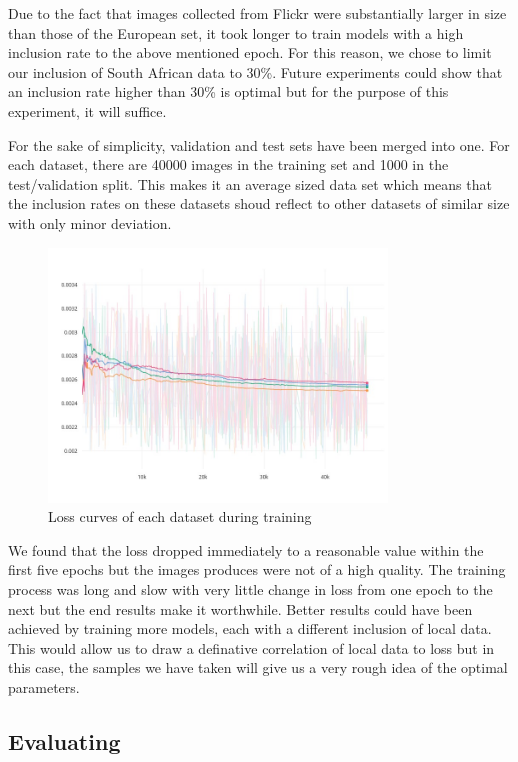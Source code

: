 \documentclass[conference]{IEEEtran}
\begin{document}
Due to the fact that images collected from Flickr were substantially larger in size than those of the European set, it took longer to train models with a high inclusion rate to the above mentioned epoch. For this reason, we chose to limit our inclusion of South African data to 30\%. Future experiments could show that an inclusion rate higher than 30\% is optimal but for the purpose of this experiment, it will suffice.

For the sake of simplicity, validation and test sets have been merged into one. For each dataset, there are 40000 images in the training set and 1000 in the test/validation split. This makes it an average sized data set which means that the inclusion rates on these datasets shoud reflect to other datasets of similar size with only minor deviation.

\begin{figure}[h]
\centering
\includegraphics[width=9cm]{Curves/loss_train}
\caption{Loss curves of each dataset during training}
\label{fig:loss_train}
\end{figure}

We found that the loss dropped immediately to a reasonable value within the first five epochs but the images produces were not of a high quality. The training process was long and slow with very little change in loss from one epoch to the next but the end results make it worthwhile. Better results could have been achieved by training more models, each with a different inclusion of local data. This would allow us to draw a definative correlation of local data to loss but in this case, the samples we have taken will give us a very rough idea of the optimal parameters.


\subsection{Evaluating}
\end{document}

